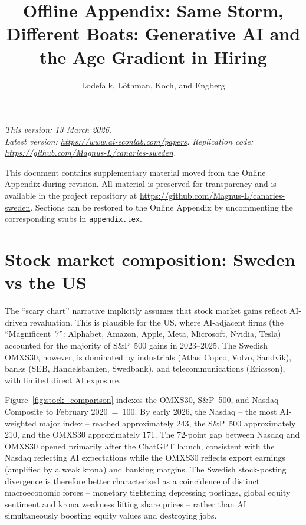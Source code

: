 \documentclass[preprint,12pt,authoryear]{elsarticle}
\begin{document}
\begin{frontmatter}
\title{Offline Appendix: Same Storm, Different Boats: Generative AI and the Age Gradient in Hiring}
\author{Lodefalk, L\"{o}thman, Koch, and Engberg}
\end{frontmatter}

\noindent\textit{This version: 13 March 2026.}\\
\noindent\textit{Latest version: \url{https://www.ai-econlab.com/papers}. Replication code: \url{https://github.com/Magnus-L/canaries-sweden}.}

\bigskip

\setcounter{section}{0}
\renewcommand{\thesection}{OA\arabic{section}}
\renewcommand{\thetable}{OA\arabic{table}}
\renewcommand{\thefigure}{OA\arabic{figure}}

\noindent This document contains supplementary material moved from the Online Appendix during revision. All material is preserved for transparency and is available in the project repository at \url{https://github.com/Magnus-L/canaries-sweden}. Sections can be restored to the Online Appendix by uncommenting the corresponding stubs in \texttt{appendix.tex}.



\section{Stock market composition: Sweden vs the US}

The ``scary chart'' narrative implicitly assumes that stock market gains reflect AI-driven revaluation. This is plausible for the US, where AI-adjacent firms (the ``Magnificent~7'': Alphabet, Amazon, Apple, Meta, Microsoft, Nvidia, Tesla) accounted for the majority of S\&P~500 gains in 2023--2025. The Swedish OMXS30, however, is dominated by industrials (Atlas~Copco, Volvo, Sandvik), banks (SEB, Handelsbanken, Swedbank), and telecommunications (Ericsson), with limited direct AI exposure.

Figure~\ref{fig:stock_comparison} indexes the OMXS30, S\&P~500, and Nasdaq Composite to February 2020~=~100. By early 2026, the Nasdaq -- the most AI-weighted major index -- reached approximately 243, the S\&P~500 approximately 210, and the OMXS30 approximately 171. The 72-point gap between Nasdaq and OMXS30 opened primarily after the ChatGPT launch, consistent with the Nasdaq reflecting AI expectations while the OMXS30 reflects export earnings (amplified by a weak krona) and banking margins. The Swedish stock-posting divergence is therefore better characterised as a coincidence of distinct macroeconomic forces -- monetary tightening depressing postings, global equity sentiment and krona weakness lifting share prices -- rather than AI simultaneously boosting equity values and destroying jobs.
\end{document}
